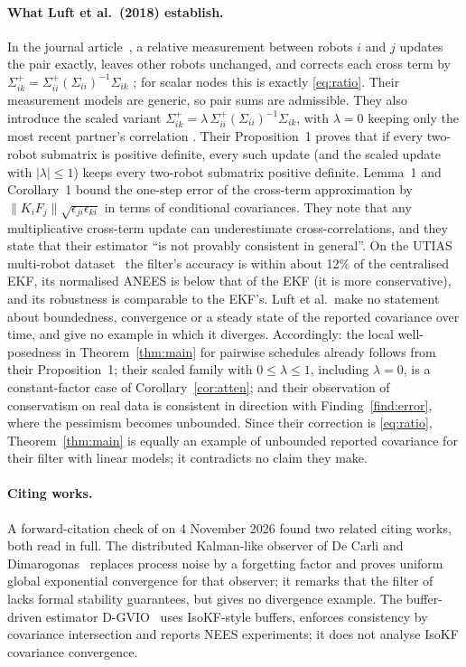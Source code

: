 \documentclass[11pt,a4paper]{article}
\numberwithin{equation}{section}
\theoremstyle{remark}\newtheorem{remark}[theorem]{Remark}
\begin{document}
\paragraph{What Luft et al.\ (2018) establish.} In the journal article~\citep{Luft2018}, a
relative measurement between robots $i$ and $j$ updates the pair exactly, leaves other robots
unchanged, and corrects each cross term by
$\Sigma_{ik}^{+}=\Sigma_{ii}^{+}(\Sigma_{ii})^{-1}\Sigma_{ik}$ \citep[eq.~(26)]{Luft2018}; for
scalar nodes this is exactly \eqref{eq:ratio}. Their measurement models are generic, so pair
sums are admissible. They also introduce the scaled variant
$\Sigma_{ik}^{+}=\lambda\,\Sigma_{ii}^{+}(\Sigma_{ii})^{-1}\Sigma_{ik}$, with $\lambda=0$ keeping only
the most recent partner's correlation \citep[eq.~(28)]{Luft2018}. Their Proposition~1 proves that if
every two-robot submatrix is positive definite, every such update (and the scaled update with
$|\lambda|\le1$) keeps every two-robot submatrix positive definite. Lemma~1 and Corollary~1 bound the
one-step error of the cross-term approximation by $\|K_iF_j\|\sqrt{\epsilon_{ji}\epsilon_{ki}}$ in
terms of conditional covariances. They note that any multiplicative cross-term update can
underestimate cross-correlations, and they state that their estimator ``is not provably consistent
in general''. On the UTIAS multi-robot dataset~\citep[Tables~2--4]{Luft2018} the filter's accuracy
is within about 12\% of the centralised EKF, its normalised ANEES is below that of the EKF (it is
more conservative), and its robustness is comparable to the EKF's. Luft et al.\ make no statement
about boundedness, convergence or a steady state of the reported covariance over time, and give
no example in which it diverges. Accordingly: the local well-posedness in
Theorem~\ref{thm:main} for pairwise schedules already follows from their Proposition~1; their
scaled family with $0\le\lambda\le1$, including $\lambda=0$, is a constant-factor case of
Corollary~\ref{cor:atten}; and their observation of conservatism on real data is consistent in
direction with Finding~\ref{find:error}, where the pessimism becomes unbounded. Since their
correction is \eqref{eq:ratio}, Theorem~\ref{thm:main} is equally an example of unbounded
reported covariance for their filter with linear models; it contradicts no claim they make.

\paragraph{Citing works.} A forward-citation check of \citep{JungLuftWeiss2025} on 4 November
2026 found two related citing works, both read in full. The distributed Kalman-like observer of
De Carli and Dimarogonas~\citep{DeCarliDimarogonas2025} replaces process noise by a forgetting
factor and proves uniform global exponential convergence for that observer; it remarks that the
filter of~\citep{Luft2018} lacks formal stability guarantees, but gives no divergence example.
The buffer-driven estimator D-GVIO~\citep{DGVIO2026} uses IsoKF-style buffers, enforces consistency
by covariance intersection and reports NEES experiments; it does not analyse IsoKF covariance
convergence.
\end{document}
